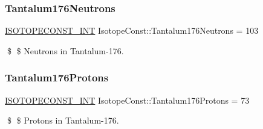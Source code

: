 \subsubsection{\texorpdfstring{Tantalum176\+Neutrons}{Tantalum176Neutrons}}
{\footnotesize\ttfamily \mbox{\hyperlink{group___isotope_const-_macros_ga5f18360b3e99483a35c32d789e62621c}{I\+S\+O\+T\+O\+P\+E\+C\+O\+N\+S\+T\+\_\+\+I\+NT}} Isotope\+Const\+::\+Tantalum176\+Neutrons = 103}

\$ \$ Neutrons in Tantalum-\/176. \mbox{\label{group___isotope_const-_tantalum-_ta176_ga5b972d733934691b9f23e85e4ba862eb}} 
\subsubsection{\texorpdfstring{Tantalum176\+Protons}{Tantalum176Protons}}
{\footnotesize\ttfamily \mbox{\hyperlink{group___isotope_const-_macros_ga5f18360b3e99483a35c32d789e62621c}{I\+S\+O\+T\+O\+P\+E\+C\+O\+N\+S\+T\+\_\+\+I\+NT}} Isotope\+Const\+::\+Tantalum176\+Protons = 73}

\$ \$ Protons in Tantalum-\/176. 